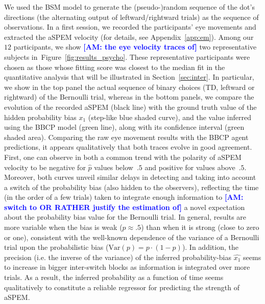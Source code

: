 \documentclass[12pt,english]{article}%
\newcommand{\seeFig}[1]{Figure~\ref{fig:#1}}
\newcommand{\seeApp}[1]{Appendix~\ref{app:#1}}
\newcommand{\seeSec}[1]{Section~\ref{sec:#1}}
\newcommand{\AM}[1]{\textbf{\textcolor{blue}{[AM: #1]}}}
\begin{document}
We used the BSM model to generate the (pseudo-)random sequence of
the dot's directions (the alternating output of leftward/rightward trials)
as the sequence of observations.
In a first session, we recorded the participants' eye movements and
extracted the aSPEM velocity (for details, see \seeApp{em}).
Among our $12$ participants, we show \AM{the eye velocity traces of} two representative subjects in~\seeFig{results_psycho}.
These representative participants were chosen as those
whose fitting score was closest to the median fit in the quantitative analysis
that will be illustrated in \seeSec{inter}.
In particular, we show in the top panel the actual sequence of binary choices
(TD, leftward or rightward) of the Bernoulli trial, whereas in the bottom panels, we compare the evolution of the recorded aSPEM (black line) with
the ground truth value of the hidden probability bias $x_1$ (step-like blue shaded curve),
and the value inferred using the BBCP model (green line), along with its confidence interval (green shaded area).
Comparing the raw eye movement results with the BBCP agent predictions,
it appears qualitatively that both traces evolve in good agreement.
First, one can observe in both a common trend with the polarity of aSPEM velocity
to be negative for $\hat{p}$ values below~$.5$ and positive for values above~$.5$.
Moreover, both curves unveil similar delays in detecting and taking into account a switch of the probability bias (also hidden to the observers),
reflecting the time (in the order of a few trials) taken to integrate enough information
to \AM{switch to OR RATHER justify the estimation of} a novel expectation about the probability bias value for the Bernoulli trial.
In general, results are more variable when the bias is weak ($p\approx .5$)
than when it is strong (close to zero or one),
consistent with the well-known dependence of the variance of a Bernoulli trial
upon the probabilistic bias ($\textrm{Var}(p)= p \cdot (1-p)$).
In addition, the precision (i.e. the inverse of the variance)
of the inferred probability-bias $\hat{x_1}$ seems to increase
in bigger inter-switch blocks as information is integrated over more trials.
As a result, the inferred probability as a function of time
seems qualitatively to constitute a reliable regressor
for predicting the strength of aSPEM.
\end{document}
